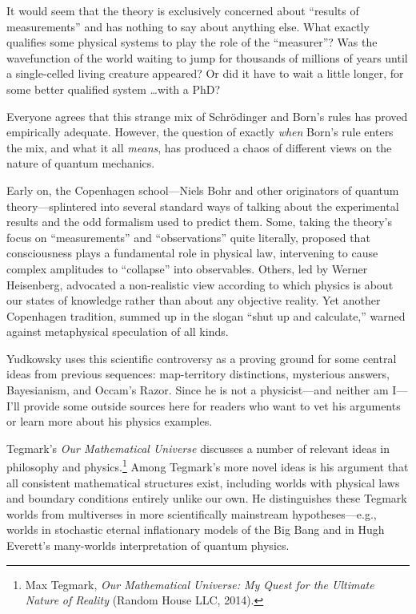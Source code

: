{
 It would seem that the theory is exclusively concerned about
``results of measurements'' and has
nothing to say about anything else. What exactly qualifies some
physical systems to play the role of the
``measurer''? Was the wavefunction
of the world waiting to jump for thousands of millions of years until a
single-celled living creature appeared? Or did it have to wait a little
longer, for some better qualified system \ldots with a PhD?}

{
 Everyone agrees that this strange mix of Schrödinger and
Born's rules has proved empirically adequate. However,
the question of exactly \textit{when} Born's rule
enters the mix, and what it all \textit{means}, has produced a chaos of
different views on the nature of quantum mechanics.}

{
 Early on, the Copenhagen school---Niels Bohr and other originators
of quantum theory---splintered into several standard ways of talking
about the experimental results and the odd formalism used to predict
them. Some, taking the theory's focus on
``measurements'' and
``observations'' quite literally,
proposed that consciousness plays a fundamental role in physical law,
intervening to cause complex amplitudes to
``collapse'' into observables.
Others, led by Werner Heisenberg, advocated a non-realistic view
according to which physics is about our states of knowledge rather than
about any objective reality. Yet another Copenhagen tradition, summed
up in the slogan ``shut up and
calculate,'' warned against metaphysical speculation
of all kinds.}

{
 Yudkowsky uses this scientific controversy as a proving ground for
some central ideas from previous sequences: map-territory distinctions,
mysterious answers, Bayesianism, and Occam's Razor.
Since he is not a physicist---and neither am I---I'll
provide some outside sources here for readers who want to vet his
arguments or learn more about his physics examples.}

{
 Tegmark's \textit{Our Mathematical Universe}
discusses a number of relevant ideas in philosophy and
physics.\footnote{Max Tegmark, \textit{Our Mathematical Universe: My Quest for
the Ultimate Nature }\textit{of Reality} (Random House LLC, 2014).} Among Tegmark's more novel
ideas is his argument that all consistent mathematical structures
exist, including worlds with physical laws and boundary conditions
entirely unlike our own. He distinguishes these Tegmark worlds from
multiverses in more scientifically mainstream hypotheses---e.g., worlds
in stochastic eternal inflationary models of the Big Bang and in Hugh
Everett's many-worlds interpretation of quantum
physics.}

